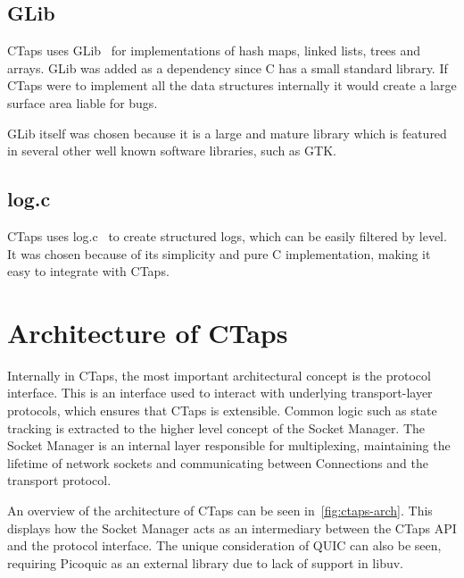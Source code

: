 \subsection{GLib} \label{sec:glib-design-reason}
CTaps uses GLib~\cite{GLibGitLab} for implementations of
hash maps, linked lists, trees and arrays.
GLib was added as a dependency since C has a small standard library.
If CTaps were to implement all the data structures internally
it would create a large surface area liable for bugs.

GLib itself was chosen because it is a large and mature library
which is featured in several other well known software libraries,
such as GTK.

\subsection{log.c}
CTaps uses log.c~\cite{logc} to create structured logs, which
can be easily filtered by level.
It was chosen because of its simplicity
and pure C implementation, making it easy to integrate
with CTaps.

\section{Architecture of CTaps} \label{sec:ctaps-arch-design}
Internally in CTaps, the most important architectural concept is the
protocol interface. This is an interface used
to interact with underlying transport-layer protocols, which ensures that CTaps is extensible.
Common logic such as state tracking
is extracted to the higher level concept of the Socket Manager. The Socket Manager is an internal layer 
responsible for multiplexing, maintaining the lifetime of network sockets and communicating
between Connections and the transport protocol.

An overview of the architecture of CTaps can be seen in~\cref{fig:ctaps-arch}.
This displays how the Socket Manager
acts as an intermediary between the CTaps API and the
protocol interface. The unique consideration of QUIC can
also be seen, requiring Picoquic as an external library due to lack
of support in libuv.


